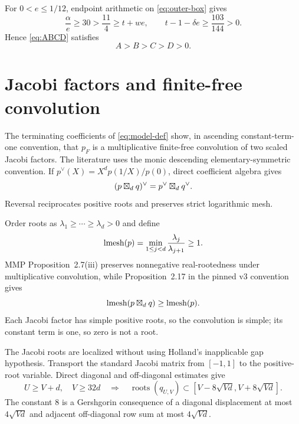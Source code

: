 \documentclass[12pt]{article}
\begin{document}
For $0<e\le1/12$, endpoint arithmetic on \eqref{eq:outer-box} gives
\begin{equation}\label{eq:ordering-margins}
 \frac\alpha e\ge30>\frac{11}{4}\ge t+we,\qquad
 t-1-\delta e\ge\frac{103}{144}>0.
\end{equation}
Hence \eqref{eq:ABCD} satisfies
\begin{equation}\label{eq:ABCD-order}
 A>B>C>D>0.
\end{equation}

\section{Jacobi factors and finite-free convolution}\label{sec:finitefree}

The terminating coefficients of \eqref{eq:model-def} show, in ascending
constant-term-one convention, that $p_F$ is a multiplicative finite-free
convolution of two scaled Jacobi factors.  The literature uses the monic
descending elementary-symmetric convention.  If
$p^\vee(X)=X^dp(1/X)/p(0)$, direct coefficient algebra gives
\begin{equation}\label{eq:reversal-convolution}
 (p\boxtimes_d q)^\vee=p^\vee\boxtimes_d q^\vee.
\end{equation}
Reversal reciprocates positive roots and preserves strict logarithmic mesh.

Order roots as $\lambda_1\ge\cdots\ge\lambda_d>0$ and define
\begin{equation}\label{eq:lmesh}
 \operatorname{lmesh}(p)=\min_{1\le j<d}\frac{\lambda_j}{\lambda_{j+1}}\ge1.
\end{equation}
MMP Proposition~2.7(iii) preserves nonnegative real-rootedness under
multiplicative convolution, while Proposition~2.17 in the pinned v3
convention gives
\begin{equation}\label{eq:lmesh-mmp}
 \operatorname{lmesh}(p\boxtimes_d q)\ge\operatorname{lmesh}(p).
\end{equation}
Each Jacobi factor has simple positive roots, so the convolution is simple;
its constant term is one, so zero is not a root.

The Jacobi roots are localized without using Holland's inapplicable gap
hypothesis.  Transport the standard Jacobi matrix from $[-1,1]$ to the
positive-root variable.  Direct diagonal and off-diagonal estimates give
\begin{equation}\label{eq:jacobi-local}
 U\ge V+d,\quad V\ge32d
 \quad\Longrightarrow\quad
 \operatorname{roots}(q_{U,V})\subset
 [V-8\sqrt{Vd},V+8\sqrt{Vd}].
\end{equation}
The constant $8$ is a Gershgorin consequence of a diagonal displacement at
most $4\sqrt{Vd}$ and adjacent off-diagonal row sum at most
$4\sqrt{Vd}$.
\end{document}

